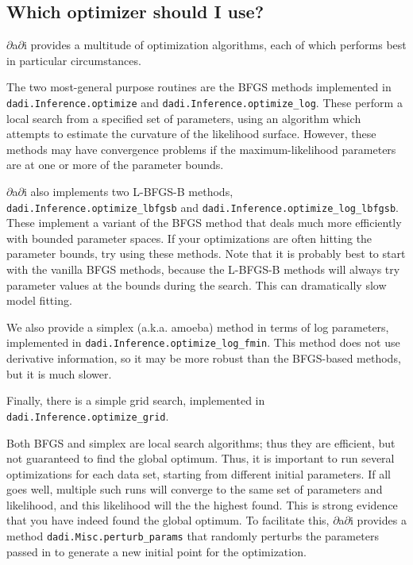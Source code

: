 \documentclass[12pt]{article}
\makeatletter
\newcommand{\dadi}{$\partial$a$\partial$i\xspace}
\newcommand{\py}[1]{\lstinline[language=Python, showstringspaces=False]@#1@}
\makeatother
\begin{document}
\subsection{Which optimizer should I use?}\label{sec:which_optimizer}

\dadi provides a multitude of optimization algorithms, each of which performs best in particular circumstances.

The two most-general purpose routines are the BFGS methods implemented in \py{dadi.Inference.optimize} and \py{dadi.Inference.optimize_log}.
These perform a local search from a specified set of parameters, using an algorithm which attempts to estimate the curvature of the likelihood surface.
However, these methods may have convergence problems if the maximum-likelihood parameters are at one or more of the parameter bounds.

\dadi also implements two L-BFGS-B methods, \py{dadi.Inference.optimize_lbfgsb} and \py{dadi.Inference.optimize_log_lbfgsb}.
These implement a variant of the BFGS method that deals much more efficiently with bounded parameter spaces.
If your optimizations are often hitting the parameter bounds, try using these methods.
Note that it is probably best to start with the vanilla BFGS methods, because the L-BFGS-B methods will always try parameter values at the bounds during the search.
This can dramatically slow model fitting.

We also provide a simplex (a.k.a. amoeba) method in terms of log parameters, implemented in \py{dadi.Inference.optimize_log_fmin}.
This method does not use derivative information, so it may be more robust than the BFGS-based methods, but it is much slower.

Finally, there is a simple grid search, implemented in \py{dadi.Inference.optimize_grid}.

Both BFGS and simplex are local search algorithms; thus they are efficient, but not guaranteed to find the global optimum.
Thus, it is important to run several optimizations for each data set, starting from different initial parameters.
If all goes well, multiple such runs will converge to the same set of parameters and likelihood, and this likelihood will the the highest found.
This is strong evidence that you have indeed found the global optimum.
To facilitate this, \dadi provides a method \py{dadi.Misc.perturb_params} that randomly perturbs the parameters passed in to generate a new initial point for the optimization.

\end{document}
